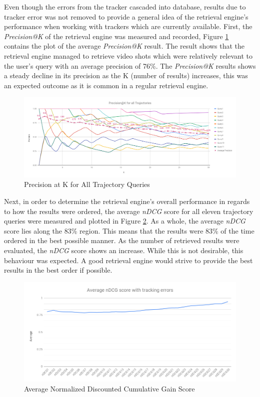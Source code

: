 Even though the errors from the tracker\cite{lim2017} cascaded into database, results due to tracker error was not removed to provide a general idea of the retrieval engine's performance when working with trackers which are currently available. First, the \textit{Precision@K} of the retrieval engine was measured and recorded, Figure \ref{fig:versionTwoPreAtK} contains the plot of the average \textit{Precision@K} result. The result shows that the retrieval engine managed to retrieve video shots which were relatively relevant to the user's query with an average precision of 76\%. The \textit{Precision@K} results shows a steady decline in its precision as the K (number of results) increases, this was an expected outcome as it is common in a regular retrieval engine. 

\begin{figure}[!ht]
  \centering
    \includegraphics[width=\linewidth]{image/retrievalTwo/p@k.png}
  \caption{Precision at K for All Trajectory Queries}
  \label{fig:versionTwoPreAtK}
\end{figure}

Next, in order to determine the retrieval engine's overall performance in regards to how the results were ordered, the average \textit{nDCG} score for all eleven trajectory queries were measured and plotted in Figure \ref{fig:ndcgWithError}. As a whole, the average \textit{nDCG} score lies along the 83\% region. This means that the results were 83\% of the time ordered in the best possible manner. As the number of retrieved results were evaluated, the \textit{nDCG} score shows an increase. 
While this is not desirable, this behaviour was expected. A good retrieval engine would strive to provide the best results in the best order if possible.  

\begin{figure}[!ht]
  \centering
    \includegraphics[width=0.9\linewidth]{image/retrievalTwo/averageNDCG.png}
  \caption{Average Normalized Discounted Cumulative Gain Score}
  \label{fig:ndcgWithError}
\end{figure}

